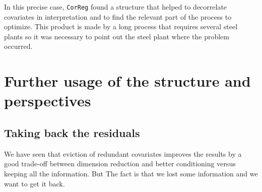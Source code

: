 \documentclass[12pt,a4paper]{report}
\begin{document}
In this precise case, {\tt CorReg} found a structure that helped to decorrelate covariates in interpretation and to find the relevant part of the process to optimize. This product is made by a long process that requires several steel plants so it was necessary to point out the steel plant where the problem occurred.


\part{Further usage of the structure and perspectives}	
			
		
\chapter{Taking back the residuals}
	We have seen that eviction of redundant covariates improves the results by a good trade-off between dimension reduction and better conditioning versus keeping all the information. But The fact is that we lost some information and we want to get it back.
\end{document}
